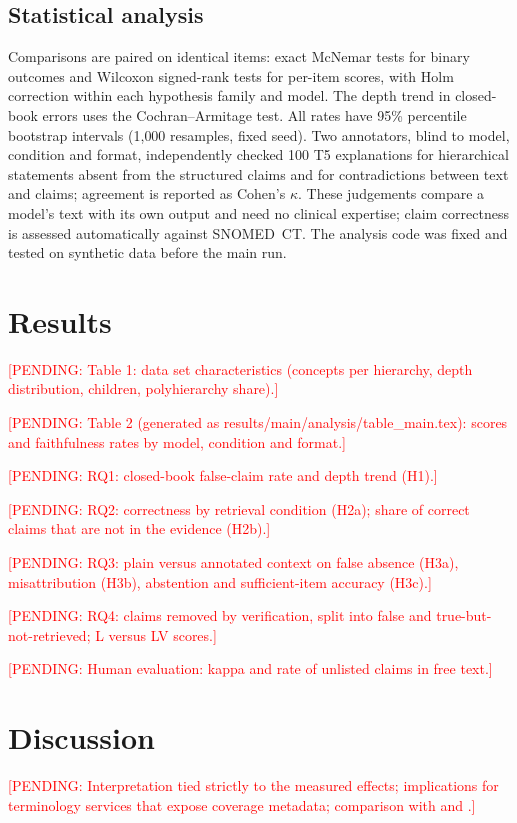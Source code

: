 \documentclass[11pt]{article}
\newcommand{\pending}[1]{\textcolor{red}{[PENDING: #1]}}
\newcommand{\sct}{SNOMED~CT}
\begin{document}
\subsection{Statistical analysis}
Comparisons are paired on identical items: exact McNemar tests for binary outcomes and Wilcoxon signed-rank tests for per-item scores, with Holm correction within each hypothesis family and model. The depth trend in closed-book errors uses the Cochran--Armitage test. All rates have 95\% percentile bootstrap intervals (1{,}000 resamples, fixed seed). Two annotators, blind to model, condition and format, independently checked 100 T5 explanations for hierarchical statements absent from the structured claims and for contradictions between text and claims; agreement is reported as Cohen's $\kappa$. These judgements compare a model's text with its own output and need no clinical expertise; claim correctness is assessed automatically against \sct{}. The analysis code was fixed and tested on synthetic data before the main run.

\section{Results}
\pending{Table 1: data set characteristics (concepts per hierarchy, depth distribution, children, polyhierarchy share).}

\pending{Table 2 (generated as results/main/analysis/table\_main.tex): scores and faithfulness rates by model, condition and format.}

\pending{RQ1: closed-book false-claim rate and depth trend (H1).}

\pending{RQ2: correctness by retrieval condition (H2a); share of correct claims that are not in the evidence (H2b).}

\pending{RQ3: plain versus annotated context on false absence (H3a), misattribution (H3b), abstention and sufficient-item accuracy (H3c).}

\pending{RQ4: claims removed by verification, split into false and true-but-not-retrieved; L versus LV scores.}

\pending{Human evaluation: kappa and rate of unlisted claims in free text.}

\section{Discussion}
\pending{Interpretation tied strictly to the measured effects; implications for terminology services that expose coverage metadata; comparison with \citet{zhou2026brink} and \citet{joren2025sufficient}.}
\end{document}
